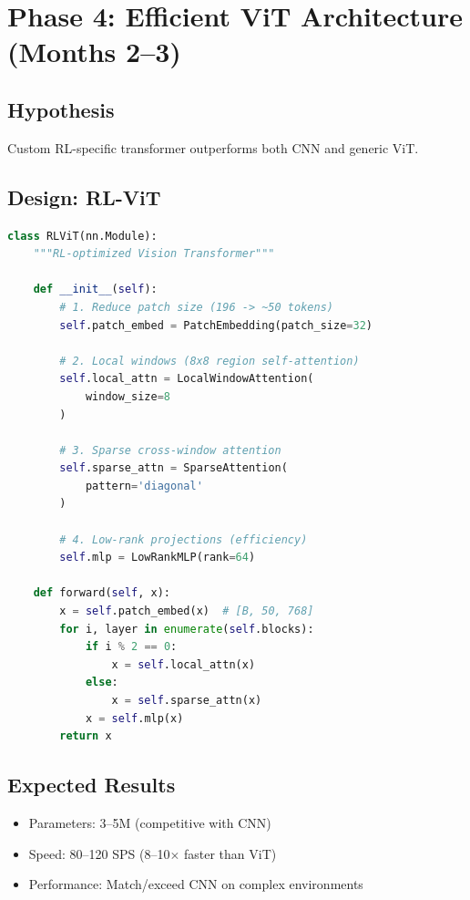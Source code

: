 \documentclass[12pt,a4paper,openany]{report}
\begin{document}
\section{Phase 4: Efficient ViT Architecture (Months 2--3)}

\subsection{Hypothesis}

Custom RL-specific transformer outperforms both CNN and generic ViT.

\subsection{Design: RL-ViT}

\begin{lstlisting}[language=Python, caption=RL-Optimized Vision Transformer]
class RLViT(nn.Module):
    """RL-optimized Vision Transformer"""
    
    def __init__(self):
        # 1. Reduce patch size (196 -> ~50 tokens)
        self.patch_embed = PatchEmbedding(patch_size=32)
        
        # 2. Local windows (8x8 region self-attention)
        self.local_attn = LocalWindowAttention(
            window_size=8
        )
        
        # 3. Sparse cross-window attention
        self.sparse_attn = SparseAttention(
            pattern='diagonal'
        )
        
        # 4. Low-rank projections (efficiency)
        self.mlp = LowRankMLP(rank=64)
        
    def forward(self, x):
        x = self.patch_embed(x)  # [B, 50, 768]
        for i, layer in enumerate(self.blocks):
            if i % 2 == 0:
                x = self.local_attn(x)
            else:
                x = self.sparse_attn(x)
            x = self.mlp(x)
        return x
\end{lstlisting}

\subsection{Expected Results}

\begin{itemize}
    \item Parameters: 3--5M (competitive with CNN)
    \item Speed: 80--120 SPS (8--10$\times$ faster than ViT)
    \item Performance: Match/exceed CNN on complex environments
\end{itemize}
\end{document}
